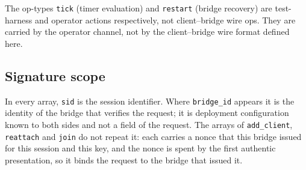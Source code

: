 \noindent The op-types \texttt{tick} (timer evaluation) and
\texttt{restart} (bridge recovery) are test-harness and
operator actions respectively, not client--bridge wire ops. They
are carried by the operator channel, not by the client--bridge wire
format defined here.

\subsection{Signature scope}

In every array, \texttt{sid} is the session identifier. Where
\texttt{bridge\_id} appears it is the identity of the bridge that verifies the
request; it is deployment configuration known to both sides and not a field of
the request. The arrays of \texttt{add\_client}, \texttt{reattach} and
\texttt{join} do not repeat it: each carries a nonce that this bridge issued
for this session and this key, and the nonce is spent by the first authentic
presentation, so it binds the request to the bridge that issued it.

